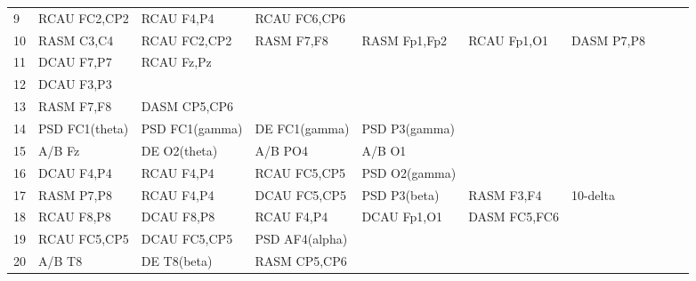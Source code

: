 \begin{landscape}
\begin{table}[]
\begin{tabular}{l|llllllll}
9        & RCAU FC2,CP2   & RCAU F4,P4     & RCAU FC6,CP6   &                &                &                &                &                &               &              \\
10       & RASM C3,C4     & RCAU FC2,CP2   & RASM F7,F8     & RASM Fp1,Fp2   & RCAU Fp1,O1    & DASM P7,P8     &                &                &               &              \\
11       & DCAU F7,P7     & RCAU Fz,Pz     &                &                &                &                &                &                &               &              \\
12       & DCAU F3,P3     &                &                &                &                &                &                &                &               &              \\
13       & RASM F7,F8     & DASM CP5,CP6   &                &                &                &                &                &                &               &              \\
14       & PSD FC1(theta) & PSD FC1(gamma) & DE FC1(gamma)  & PSD P3(gamma)  &                &                &                &                &               &              \\
15       & A/B Fz         & DE O2(theta)   & A/B PO4        & A/B O1         &                &                &                &                &               &              \\
16       & DCAU F4,P4     & RCAU F4,P4     & RCAU FC5,CP5   & PSD O2(gamma)  &                &                &                &                &               &              \\
17       & RASM P7,P8     & RCAU F4,P4     & DCAU FC5,CP5   & PSD P3(beta)   & RASM F3,F4     & 10-delta       &                &                &               &              \\
18       & RCAU F8,P8     & DCAU F8,P8     & RCAU F4,P4     & DCAU Fp1,O1    & DASM FC5,FC6   &                &                &                &               &              \\
19       & RCAU FC5,CP5   & DCAU FC5,CP5   & PSD AF4(alpha) &                &                &                &                &                &               &              \\
20       & A/B T8         & DE T8(beta)    & RASM CP5,CP6   &                &                &                &                &                &               &              \\

\end{tabular}
\end{table}
\end{landscape}
